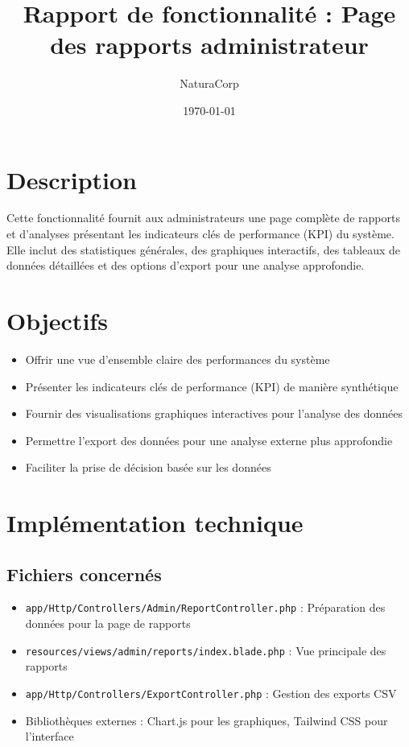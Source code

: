 \documentclass[12pt,a4paper]{article}
\title{Rapport de fonctionnalité : Page des rapports administrateur}
\author{NaturaCorp}
\date{\today}
\begin{document}
\maketitle

\section{Description}
Cette fonctionnalité fournit aux administrateurs une page complète de rapports et d'analyses présentant les indicateurs clés de performance (KPI) du système. Elle inclut des statistiques générales, des graphiques interactifs, des tableaux de données détaillées et des options d'export pour une analyse approfondie.

\section{Objectifs}
\begin{itemize}
    \item Offrir une vue d'ensemble claire des performances du système
    \item Présenter les indicateurs clés de performance (KPI) de manière synthétique
    \item Fournir des visualisations graphiques interactives pour l'analyse des données
    \item Permettre l'export des données pour une analyse externe plus approfondie
    \item Faciliter la prise de décision basée sur les données
\end{itemize}

\section{Implémentation technique}

\subsection{Fichiers concernés}
\begin{itemize}
    \item \texttt{app/Http/Controllers/Admin/ReportController.php} : Préparation des données pour la page de rapports
    \item \texttt{resources/views/admin/reports/index.blade.php} : Vue principale des rapports
    \item \texttt{app/Http/Controllers/ExportController.php} : Gestion des exports CSV
    \item Bibliothèques externes : Chart.js pour les graphiques, Tailwind CSS pour l'interface
\end{itemize}
\end{document}
